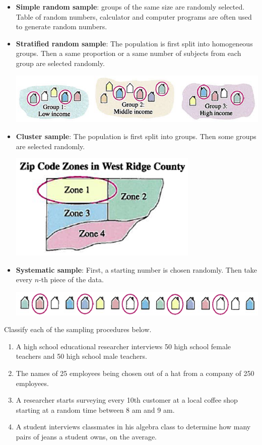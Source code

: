 \begin{itemize}
\item
  \textbf{Simple random sample}: groups of the same size are randomly
  selected. Table of random numbers, calculator and computer programs are often
  used to generate random numbers.
\item
  \textbf{Stratified random sample}: The population is first split into
  homogeneous groups. Then a same proportion or a same number of subjects from each group are selected randomly.

  \centerline{
    \includegraphics[scale=0.5]{Figures/Stratified-Random-Sample.png}
  }
\item
  \textbf{Cluster sample}: The population is first split into groups. Then some groups are selected randomly.

  \centerline{
    \includegraphics[scale=0.5]{Figures/Cluster-Sample.png}
  }
\item
  \textbf{Systematic sample}: First, a starting number is chosen randomly. Then take every \(n\)-th piece of the data.
  
  \centerline{
    \includegraphics[scale=0.5]{Figures/Systematic-Sample.png}
  }
\end{itemize}

\begin{exercise}
Classify each of the sampling procedures below.

\begin{enumerate}[itemsep=2\baselineskip]
  \item 
  A high school educational researcher interviews 50 high school female teachers and 50 high school male teachers.
  \item The names of 25 employees being chosen out of a hat from a company of 250 employees.
  \item A researcher starts surveying every 10th customer at a local coffee shop starting at a random time between 8 am and 9 am.
  \item A student interviews classmates in his algebra class to determine how many pairs of jeans a student owns, on the average.
\end{enumerate}
\end{exercise}


